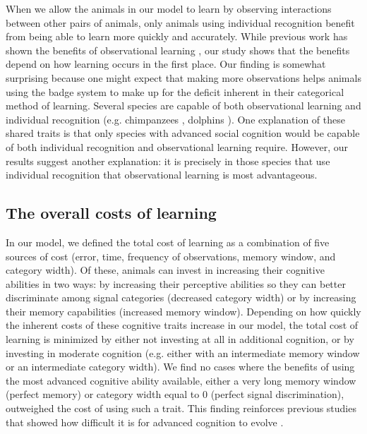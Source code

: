 When we allow the animals in our model to learn by observing interactions between other pairs of animals, only animals using individual recognition benefit from being able to learn more quickly and accurately. While previous work has shown the benefits of observational learning \citep{Freeman:1985kl,Holekamp:1991nx,Schaik:2011oq}, our study shows that the benefits depend on how learning occurs in the first place. Our finding is somewhat surprising because one might expect that making more observations helps animals using the badge system to make up for the deficit inherent in their categorical method of learning. Several species are capable of both observational learning and individual recognition (e.g. chimpanzees \citep{Parr:2000hc,Hopper:2008bh}, dolphins \citep{Sayigh:1999bs,Krutzen:2005ij}). One explanation of these shared traits is that only species with advanced social cognition would be capable of both individual recognition and observational learning require. However, our results suggest another explanation: it is precisely in those species that use individual recognition that observational learning is most advantageous.

\subsection*{The overall costs of learning} %
In our model, we defined the total cost of learning as a combination of five sources of cost (error, time, frequency of observations, memory window, and category width). Of these, animals can invest in increasing their cognitive abilities in two ways: by increasing their perceptive abilities so they can better discriminate among signal categories (decreased category width) or by increasing their memory capabilities (increased memory window). Depending on how quickly the inherent costs of these cognitive traits increase in our model, the total cost of learning is minimized by either not investing at all in additional cognition, or by investing in moderate cognition (e.g. either with an intermediate memory window or an intermediate category width). We find no cases where the benefits of using the most advanced cognitive ability available, either a very long memory window (perfect memory) or category width equal to $0$ (perfect signal discrimination), outweighed the cost of using such a trait. This finding reinforces previous studies that showed how difficult it is for advanced cognition to evolve \citep{Kerr:2003vn}.


